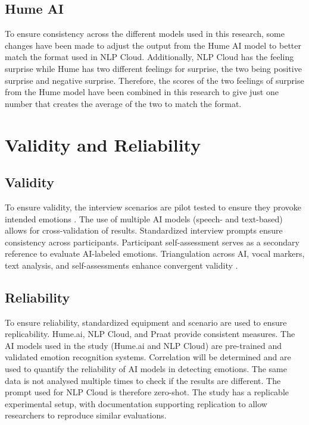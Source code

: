 \subsection{Hume AI}
To ensure consistency across the different models used in this research, some changes have been
made to adjust the output from the Hume AI model to better match the format used in NLP Cloud.
Additionally, NLP Cloud has the feeling surprise while Hume has two different feelings for surprise,
the two being positive surprise and negative surprise. Therefore, the scores of the two feelings of
surprise from the Hume model have been combined in this research to give just one number that
creates the average of the two to match the format.

\section{Validity and Reliability}
\subsection{Validity}
To ensure validity, the interview scenarios are pilot tested to ensure they provoke intended emotions \autocite{Bryman2022}. The use of multiple AI models (speech- and text-based) allows for cross-validation of results. Standardized interview prompts ensure consistency across participants. Participant self-assessment serves as a secondary reference to evaluate AI-labeled emotions. Triangulation across AI, vocal markers, text analysis, and self-assessments enhance convergent validity \autocite{Creswell2023}. 

\subsection{Reliability}
To ensure reliability, standardized equipment and scenario are used to ensure replicability. Hume.ai, NLP Cloud, and Praat provide consistent measures. The AI models used in the study (Hume.ai and NLP Cloud) are pre-trained and validated emotion recognition systems. Correlation will be determined and are used to quantify the reliability of AI models in detecting emotions. 
The same data is not analysed multiple times to check if the results are different. The prompt used for NLP Cloud is therefore zero-shot. 
The study has a replicable experimental setup, with documentation supporting replication to allow researchers to reproduce similar evaluations.  

